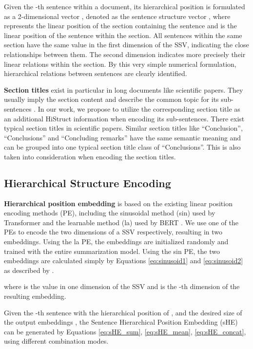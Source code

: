 \documentclass[11pt]{article}
\begin{document}
Given the -th sentence within a document, its hierarchical position is formulated as a 2-dimensional vector , denoted as the sentence structure vector , where  represents the linear position of the section containing the sentence and  is the linear position of the sentence within the section. All sentences within the same section have the same value in the first dimension of the SSV, indicating the close relationships between them. The second dimension indicates more precisely their linear relations within the section. By this very simple numerical formulation, hierarchical relations between sentences are clearly identified. 


\textbf{Section titles} exist in particular in long documents like scientific papers. They usually imply the section content and describe the common topic for its sub-sentences \cite{ostendorff-etal-2020-aspect}. 
In our work, we propose to utilize the corresponding section title as an additional HiStruct information when encoding its sub-sentences. There exist typical section titles in scientific papers. Similar section titles like ``Conclusion'', ``Conclusions'' and ``Concluding remarks''  have the same semantic meaning and can be grouped into one typical section title class of ``Conclusions''. This is also taken into consideration when encoding the section titles. 

\subsection{Hierarchical Structure Encoding}
\label{subsec:hierarchical_structure_encoding}


\textbf{Hierarchical position embedding} is based on the existing linear position encoding methods (PE), including the sinusoidal method (sin) used by Transformer \cite{transformer} and the learnable method (la) used by BERT \cite{bert}. We use one of the PEs to encode the two dimensions of a SSV respectively, resulting in two embeddings. Using the la PE, the embeddings are initialized randomly and trained with the entire summarization model. Using the sin PE, the two embeddings are calculated simply by Equations \ref{eq:sinusoid1} and \ref{eq:sinusoid2} as described by \citet{transformer}. 



\noindent
where  is the value in one dimension of the SSV and  is the -th dimension of the resulting embedding.




Given the -th sentence with the hierarchical position of , and the desired size of the output embeddings , the Sentence Hierarchical Position
Embedding (sHE) can be generated by Equations \ref{eq:sHE_sum}, \ref{eq:sHE_mean}, \ref{eq:sHE_concat}, using different combination modes. 
\end{document}
